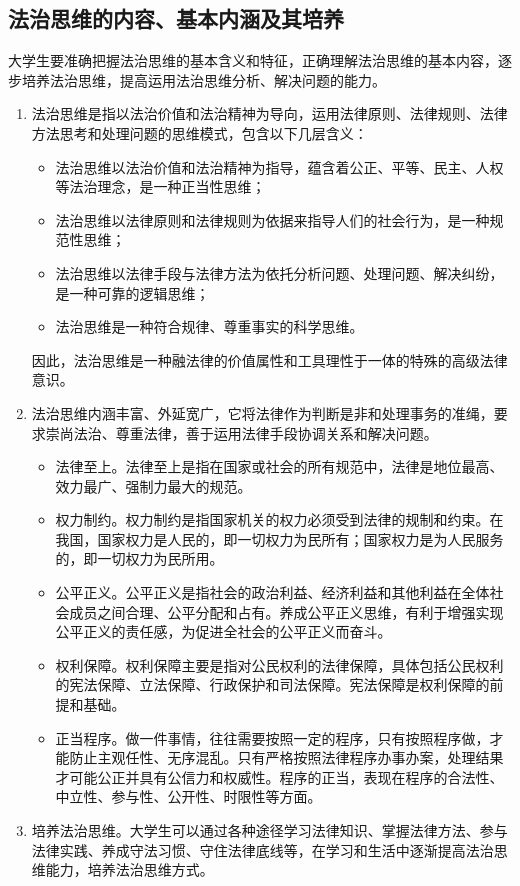 \subsection{法治思维的内容、基本内涵及其培养}
大学生要准确把握法治思维的基本含义和特征，正确理解法治思维的基本内容，逐步培养法治思维，提高运用法治思维分析、解决问题的能力。
\begin{enumerate}
\item 法治思维是指以法治价值和法治精神为导向，运用法律原则、法律规则、法律方法思考和处理问题的思维模式，包含以下几层含义：
\begin{itemize}
\item 法治思维以法治价值和法治精神为指导，蕴含着公正、平等、民主、人权等法治理念，是一种正当性思维；
\item 法治思维以法律原则和法律规则为依据来指导人们的社会行为，是一种规范性思维；
\item 法治思维以法律手段与法律方法为依托分析问题、处理问题、解决纠纷，是一种可靠的逻辑思维；
\item 法治思维是一种符合规律、尊重事实的科学思维。
\end{itemize}
因此，法治思维是一种融法律的价值属性和工具理性于一体的特殊的高级法律意识。
\item 法治思维内涵丰富、外延宽广，它将法律作为判断是非和处理事务的准绳，要求崇尚法治、尊重法律，善于运用法律手段协调关系和解决问题。
\begin{itemize}
\item 法律至上。法律至上是指在国家或社会的所有规范中，法律是地位最高、效力最广、强制力最大的规范。
\item 权力制约。权力制约是指国家机关的权力必须受到法律的规制和约束。在我国，国家权力是人民的，即一切权力为民所有；国家权力是为人民服务的，即一切权力为民所用。
\item 公平正义。公平正义是指社会的政治利益、经济利益和其他利益在全体社会成员之间合理、公平分配和占有。养成公平正义思维，有利于增强实现公平正义的责任感，为促进全社会的公平正义而奋斗。
\item 权利保障。权利保障主要是指对公民权利的法律保障，具体包括公民权利的宪法保障、立法保障、行政保护和司法保障。宪法保障是权利保障的前提和基础。
\item 正当程序。做一件事情，往往需要按照一定的程序，只有按照程序做，才能防止主观任性、无序混乱。只有严格按照法律程序办事办案，处理结果才可能公正并具有公信力和权威性。程序的正当，表现在程序的合法性、中立性、参与性、公开性、时限性等方面。
\end{itemize}
\item 培养法治思维。大学生可以通过各种途径学习法律知识、掌握法律方法、参与法律实践、养成守法习惯、守住法律底线等，在学习和生活中逐渐提高法治思维能力，培养法治思维方式。

\end{enumerate}
